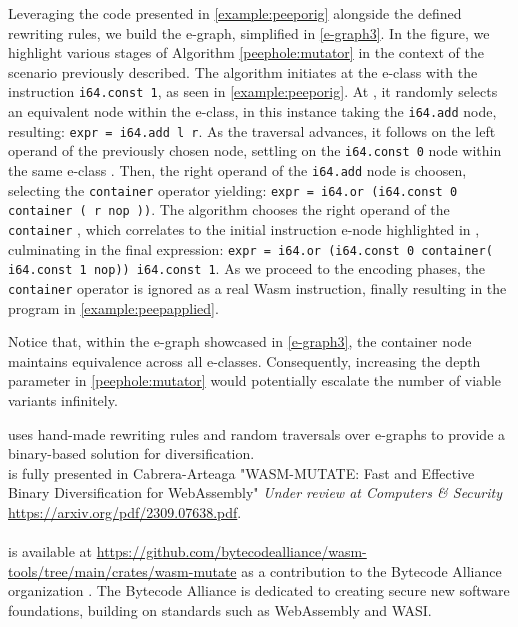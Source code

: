 Leveraging the code presented in \autoref{example:peeporig} alongside the defined rewriting rules, we build the e-graph, simplified in \autoref{e-graph3}.
In the figure, we highlight various stages of Algorithm \ref{peephole:mutator} in the context of the scenario previously described. 
The algorithm initiates at the e-class with the instruction \texttt{i64.const 1}, as seen in \autoref{example:peeporig}.
At , it randomly selects an equivalent node within the e-class, in this instance taking the \texttt{i64.add} node, resulting: {\texttt{expr = i64.add l r}}.
As the traversal advances, it follows on the left operand of the previously chosen node, settling on the \texttt{i64.const 0} node within the same e-class .
Then, the right operand of the \texttt{i64.add} node is choosen, selecting the \texttt{container}  operator yielding:
{\texttt{expr = i64.or (i64.const 0 container ( r nop ))}}.
The algorithm chooses the right operand of the \texttt{container} , which correlates to the initial instruction e-node highlighted in , culminating in the final expression:
{\texttt{expr = i64.or (i64.const 0 container( i64.const 1 nop))\ i64.const 1}}.
As we proceed to the encoding phases, the \texttt{container} operator is ignored as a real Wasm instruction, finally resulting in the program in \autoref{example:peepapplied}.

Notice that, within the e-graph showcased in \autoref{e-graph3}, the container node maintains equivalence across all e-classes. 
Consequently, increasing the depth parameter in \autoref{peephole:mutator} would potentially escalate the number of viable variants infinitely.



\begin{tcolorbox}[title=Contribution paper and artifact,boxrule=1pt,arc=.2em,boxsep=1.0mm]
  \tool uses hand-made rewriting rules and random traversals over e-graphs to provide a binary-based solution for \Wasm diversification. \\
  \tool is fully presented in Cabrera-Arteaga \etal "WASM-MUTATE: Fast and Effective Binary Diversification for WebAssembly"
  \emph{Under review at Computers \& Security}
 \url{https://arxiv.org/pdf/2309.07638.pdf}.
  \\\\
  \tool is available at \url{https://github.com/bytecodealliance/wasm-tools/tree/main/crates/wasm-mutate} as a contribution to the Bytecode Alliance organization . The Bytecode Alliance is dedicated to creating secure new software foundations, building on standards such as WebAssembly and WASI.
\end{tcolorbox}
